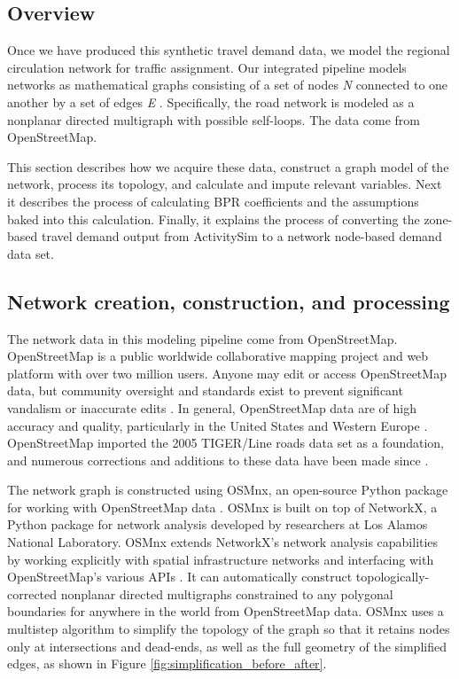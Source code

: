 \subsection{Overview}

Once we have produced this synthetic travel demand data, we model the regional circulation network for traffic assignment. Our integrated pipeline models networks as mathematical graphs consisting of a set of nodes \textit{N} connected to one another by a set of edges \textit{E} \citep{newman_networks:_2010,gastner_spatial_2006}. Specifically, the road network is modeled as a nonplanar directed multigraph with possible self-loops. The data come from OpenStreetMap.

This section describes how we acquire these data, construct a graph model of the network, process its topology, and calculate and impute relevant variables. Next it describes the process of calculating BPR coefficients and the assumptions baked into this calculation. Finally, it explains the process of converting the zone-based travel demand output from ActivitySim to a network node-based demand data set. 

\subsection{Network creation, construction, and processing}

The network data in this modeling pipeline come from OpenStreetMap. OpenStreetMap is a public worldwide collaborative mapping project and web platform with over two million users. Anyone may edit or access OpenStreetMap data, but community oversight and standards exist to prevent significant vandalism or inaccurate edits \citep{jokar_arsanjani_openstreetmap_2015}. In general, OpenStreetMap data are of high accuracy and quality, particularly in the United States and Western Europe \citep{corcoran_analysing_2013,over_generating_2010,haklay_how_2010,maron_how_2015}. OpenStreetMap imported the 2005 TIGER/Line roads data set as a foundation, and numerous corrections and additions to these data have been made since \citep{willis_openstreetmap_2008}.

The network graph is constructed using OSMnx, an open-source Python package for working with OpenStreetMap data \citep{boeing_osmnx:_2017}. OSMnx is built on top of NetworkX, a Python package for network analysis developed by researchers at Los Alamos National Laboratory. OSMnx extends NetworkX's network analysis capabilities by working explicitly with spatial infrastructure networks and interfacing with OpenStreetMap's various APIs \citep{boeing_methods_2017}. It can automatically construct topologically-corrected nonplanar directed multigraphs constrained to any polygonal boundaries for anywhere in the world from OpenStreetMap data. OSMnx uses a multistep algorithm to simplify the topology of the graph so that it retains nodes only at intersections and dead-ends, as well as the full geometry of the simplified edges, as shown in Figure \ref{fig:simplification_before_after}.

